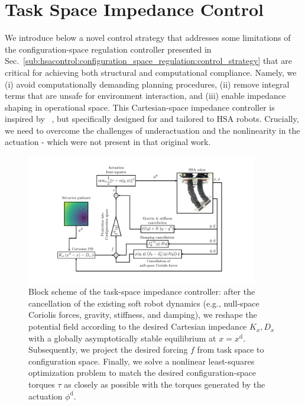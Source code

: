 \section{Task Space Impedance Control}\label{sec:hsacontrol:task_space_impedance_control}
We introduce below a novel control strategy that addresses some limitations of the configuration-space regulation controller presented in Sec.~\ref{sub:hsacontrol:configuration_space_regulation:control_strategy} that are critical for achieving both structural and computational compliance. Namely, we (i) avoid computationally demanding planning procedures, (ii) remove integral terms that are unsafe for environment interaction, and (iii) enable impedance shaping in operational space. This Cartesian-space impedance controller is inspired by ~\citep{ott2008cartesian,della2020model}, but specifically designed for and tailored to \gls{HSA} robots. Crucially, we need to overcome the challenges of underactuation and the nonlinearity in the actuation - which were not present in that original work. %

\begin{figure}
    \centering
    \includegraphics[width=0.9\textwidth]{hsacontrol/figures/control_schemes/cartesian_impedance_control/control_scheme_without_brain_control_cropped.pdf}
    \caption{Block scheme of the task-space impedance controller: after the cancellation of the existing soft robot dynamics (e.g., null-space Coriolis forces, gravity, stiffness, and damping), we reshape the potential field according to the desired Cartesian impedance $K_x, D_x$ with a globally asymptotically stable equilibrium at $x=x^\mathrm{d}$. Subsequently, we project the desired forcing $f$ from task space to configuration space. Finally, we solve a nonlinear least-squares optimization problem to match the desired configuration-space torques $\tau$ as closely as possible with the torques generated by the actuation $\phi^\mathrm{d}$.}
    \label{fig:hsacontrol:task_space_impedance_control:block_scheme_closed_loop_control}
\end{figure}

